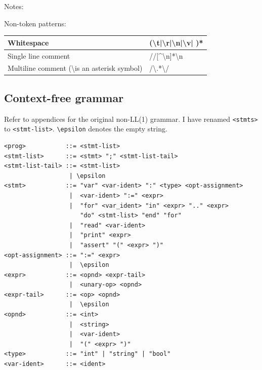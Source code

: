 \documentclass[a4paper,11pt]{article}
\begin{document}
Notes:

Non-token patterns:
\begin{table}[h!]
\begin{tabular}{| l | l |}
    \hline
    Whitespace & (\textbackslash t|\textbackslash r|\textbackslash n|\textbackslash v| )* \\
    \hline
    Single line comment & //[\^{}\textbackslash n]*\textbackslash n \\
    \hline
    Multiline comment (\textbackslash * is an asterisk symbol) & /\textbackslash *.*\textbackslash */ \\
    \hline
\end{tabular}
\end{table}

\subsection{Context-free grammar}

Refer to appendices for the original non-LL(1) grammar. I have renamed \verb,<stmts>, to \verb,<stmt-list>,. \verb,\epsilon, denotes the empty string.

\begin{verbatim}
<prog>           ::= <stmt-list>
<stmt-list>      ::= <stmt> ";" <stmt-list-tail>
<stmt-list-tail> ::= <stmt-list>
                  | \epsilon
<stmt>           ::= "var" <var-ident> ":" <type> <opt-assignment>
                  |  <var-ident> ":=" <expr>
                  |  "for" <var_ident> "in" <expr> ".." <expr>
                     "do" <stmt-list> "end" "for"
                  |  "read" <var-ident>
                  |  "print" <expr>
                  |  "assert" "(" <expr> ")"
<opt-assignment> ::= ":=" <expr>
                  |  \epsilon
<expr>           ::= <opnd> <expr-tail>
                  |  <unary-op> <opnd>
<expr-tail>      ::= <op> <opnd>
                  |  \epsilon
<opnd>           ::= <int>
                  |  <string>
                  |  <var-ident>
                  |  "(" <expr> ")"
<type>           ::= "int" | "string" | "bool"
<var-ident>      ::= <ident>
\end{verbatim}
\end{document}

